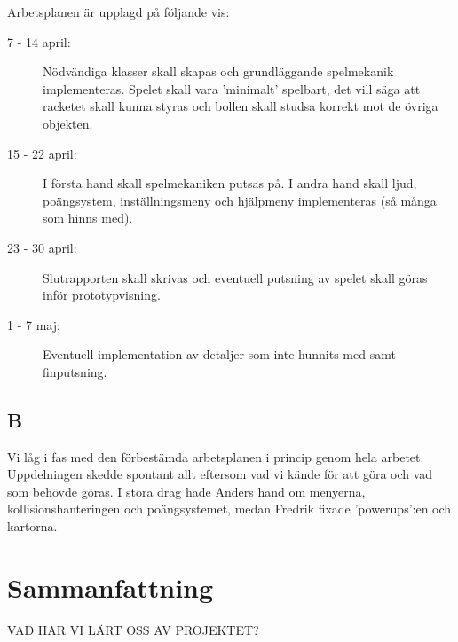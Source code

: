 \documentclass[11pt,a4paper]{article}
\begin{document}
Arbetsplanen är upplagd på följande vis:

\begin{description}
	\item[7 - 14 april:] Nödvändiga klasser skall skapas och grundläggande spelmekanik implementeras. Spelet skall vara 'minimalt' spelbart, det vill säga att racketet skall kunna styras och bollen skall studsa korrekt mot de övriga objekten.
	\item[15 - 22 april:] I första hand skall spelmekaniken putsas på. I andra hand skall ljud, poängsystem, inställningsmeny och hjälpmeny implementeras (så många som hinns med).
	\item[23 - 30 april:] Slutrapporten skall skrivas och eventuell putsning av spelet skall göras inför prototypvisning.
	\item[1 - 7 maj:] Eventuell implementation av detaljer som inte hunnits med samt finputsning.
\end{description}

\subsection{B}
Vi låg i fas med den förbestämda arbetsplanen i princip genom hela arbetet. Uppdelningen skedde spontant allt eftersom vad vi kände för att göra och vad som behövde göras. I stora drag hade Anders hand om menyerna, kollisionshanteringen och poängsystemet, medan Fredrik fixade 'powerups':en och kartorna.

\section{Sammanfattning}
VAD HAR VI LÄRT OSS AV PROJEKTET?
\end{document}
